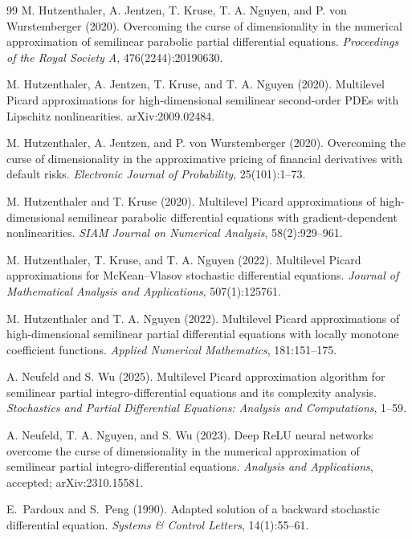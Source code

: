 \documentclass[11pt]{article}
\theoremstyle{definition}
\theoremstyle{plain}
\begin{document}
\begin{appendices}
\begin{thebibliography}{99}
 M. Hutzenthaler, A. Jentzen, T. Kruse, T. A. Nguyen, and P. von Wurstemberger (2020). \newblock Overcoming the curse of dimensionality in the numerical approximation of semilinear parabolic partial differential equations. \newblock \emph{Proceedings of the Royal Society A}, 476(2244):20190630.

 M. Hutzenthaler, A. Jentzen, T. Kruse, and T. A. Nguyen (2020). \newblock Multilevel Picard approximations for high-dimensional semilinear second-order PDEs with Lipschitz nonlinearities. \newblock arXiv:2009.02484.

 M. Hutzenthaler, A. Jentzen, and P. von Wurstemberger (2020). \newblock Overcoming the curse of dimensionality in the approximative pricing of financial derivatives with default risks. \newblock \emph{Electronic Journal of Probability}, 25(101):1--73.

 M. Hutzenthaler and T. Kruse (2020). \newblock Multilevel Picard approximations of high-dimensional semilinear parabolic differential equations with gradient-dependent nonlinearities. \newblock \emph{SIAM Journal on Numerical Analysis}, 58(2):929--961.

 M. Hutzenthaler, T. Kruse, and T. A. Nguyen (2022). \newblock Multilevel Picard approximations for McKean--Vlasov stochastic differential equations. \newblock \emph{Journal of Mathematical Analysis and Applications}, 507(1):125761.

 M. Hutzenthaler and T. A. Nguyen (2022). \newblock Multilevel Picard approximations of high-dimensional semilinear partial differential equations with locally monotone coefficient functions. \newblock \emph{Applied Numerical Mathematics}, 181:151--175.

 A. Neufeld and S. Wu (2025). \newblock Multilevel Picard approximation algorithm for semilinear partial integro-differential equations and its complexity analysis. \newblock \emph{Stochastics and Partial Differential Equations: Analysis and Computations}, 1--59.

 A. Neufeld, T. A. Nguyen, and S. Wu (2023). \newblock Deep ReLU neural networks overcome the curse of dimensionality in the numerical approximation of semilinear partial integro-differential equations. \newblock \emph{Analysis and Applications}, accepted; arXiv:2310.15581.

 E.~Pardoux and S.~Peng (1990). \newblock Adapted solution of a backward stochastic differential equation. \newblock \emph{Systems \& Control Letters}, 14(1):55--61.


\end{thebibliography}
\end{appendices}
\end{document}
